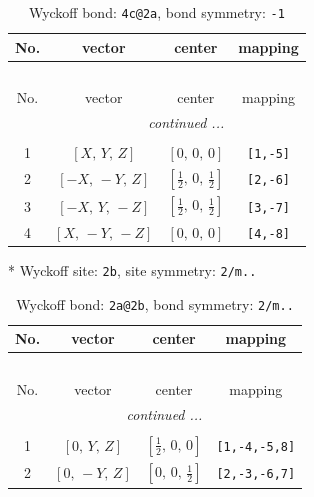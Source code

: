 \documentclass[fleqn,8pt]{jsarticle}
\begin{document}
\renewcommand{\arraystretch}{1.2}
\begin{longtable}{cccc}
\caption{Wyckoff bond: {\tt 4c@2a}, bond symmetry: {\tt -1}}
 \\
 \hline \hline
No. & vector & center & mapping \\ \hline \endfirsthead

\multicolumn{3}{l}{\tablename\ \thetable{}} \\
 \hline \hline
No. & vector & center & mapping \\ \hline \endhead

 \hline \hline
\multicolumn{3}{r}{\footnotesize\it continued ...} \\ \endfoot

 \hline \hline
\multicolumn{3}{r}{} \\ \endlastfoot

1 & $\left[ X,\, Y,\, Z \right]$ & $\left[ 0,\, 0,\, 0 \right]$ & {\tt [1,-5]} \\ \hline
2 & $\left[ - X,\, - Y,\, Z \right]$ & $\left[ \frac{1}{2},\, 0,\, \frac{1}{2} \right]$ & {\tt [2,-6]} \\ \hline
3 & $\left[ - X,\, Y,\, - Z \right]$ & $\left[ \frac{1}{2},\, 0,\, \frac{1}{2} \right]$ & {\tt [3,-7]} \\ \hline
4 & $\left[ X,\, - Y,\, - Z \right]$ & $\left[ 0,\, 0,\, 0 \right]$ & {\tt [4,-8]} \\
\end{longtable}
* Wyckoff site: {\tt 2b}, site symmetry: {\tt 2/m..}
\renewcommand{\arraystretch}{1.2}
\begin{longtable}{cccc}
\caption{Wyckoff bond: {\tt 2a@2b}, bond symmetry: {\tt 2/m..}}
 \\
 \hline \hline
No. & vector & center & mapping \\ \hline \endfirsthead

\multicolumn{3}{l}{\tablename\ \thetable{}} \\
 \hline \hline
No. & vector & center & mapping \\ \hline \endhead

 \hline \hline
\multicolumn{3}{r}{\footnotesize\it continued ...} \\ \endfoot

 \hline \hline
\multicolumn{3}{r}{} \\ \endlastfoot

1 & $\left[ 0,\, Y,\, Z \right]$ & $\left[ \frac{1}{2},\, 0,\, 0 \right]$ & {\tt [1,-4,-5,8]} \\ \hline
2 & $\left[ 0,\, - Y,\, Z \right]$ & $\left[ 0,\, 0,\, \frac{1}{2} \right]$ & {\tt [2,-3,-6,7]} \\
\end{longtable}
\end{document}
